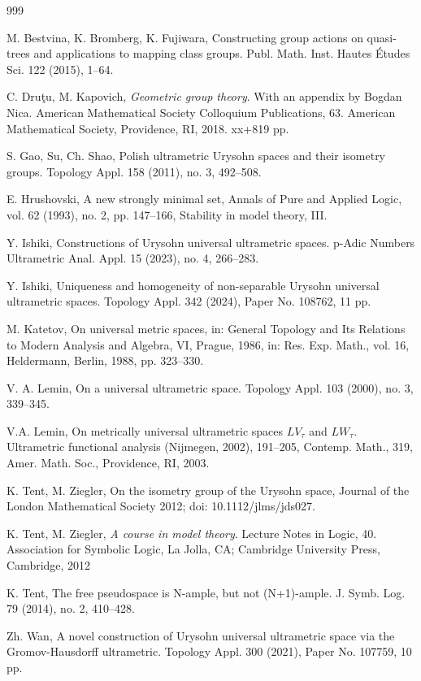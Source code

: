 \documentclass{amsart}
\begin{document}
\begin{thebibliography}{999}


 M. Bestvina, K. Bromberg, K. Fujiwara, Constructing group actions on quasi-trees and applications to mapping class groups. Publ. Math. Inst. Hautes Études Sci. 122 (2015), 1–64. 

 C. Druţu, M. Kapovich, \emph{Geometric group theory}.
With an appendix by Bogdan Nica. American Mathematical Society Colloquium Publications, 63. American Mathematical Society, Providence, RI, 2018. xx+819 pp.

  S. Gao, Su, Ch.  Shao,  Polish ultrametric Urysohn spaces and their isometry groups.
 Topology Appl.  158  (2011),  no. 3, 492--508.
 
  E. Hrushovski, A new strongly minimal set, Annals of Pure and Applied Logic,
vol. 62 (1993), no. 2, pp. 147--166, Stability in model theory, III.

 Y. Ishiki,  Constructions of Urysohn universal ultrametric spaces.
 p-Adic Numbers Ultrametric Anal. Appl.  15  (2023),  no. 4, 266--283.

 Y. Ishiki,  Uniqueness and homogeneity of non-separable Urysohn universal ultrametric spaces.
 Topology Appl.  342  (2024), Paper No. 108762, 11 pp.
		

 M. Katetov, On universal metric spaces, in: General Topology and Its Relations to Modern Analysis and Algebra, VI, Prague, 1986, in: Res. Exp. Math., vol. 16, Heldermann, Berlin, 1988, pp. 323–330.


 V. A.  Lemin,   On a universal ultrametric space.
 Topology Appl.  103  (2000),  no. 3, 339--345.


 V.A. Lemin, On metrically universal ultrametric spaces $LV_\tau$ and $LW_\tau$.
 Ultrametric functional analysis (Nijmegen, 2002), 
 191--205, Contemp. Math., 319, Amer. Math. Soc., Providence, RI,  2003.  
 
 K. Tent, M. Ziegler, On the isometry group of the Urysohn space, Journal of the London Mathematical Society 2012; doi: 10.1112/jlms/jds027. 

 K. Tent, M. Ziegler, \emph{A course in model theory}. Lecture Notes in Logic, 40. Association for Symbolic Logic, La Jolla, CA; Cambridge University Press, Cambridge, 2012

 K. Tent, The free pseudospace is N-ample, but not (N+1)-ample. J. Symb. Log. 79 (2014), no. 2, 410--428. 

 Zh. Wan, A novel construction of Urysohn universal ultrametric space via the Gromov-Hausdorff ultrametric.
 Topology Appl.  300  (2021), Paper No. 107759, 10 pp.
		

\end{thebibliography}
\end{document}
